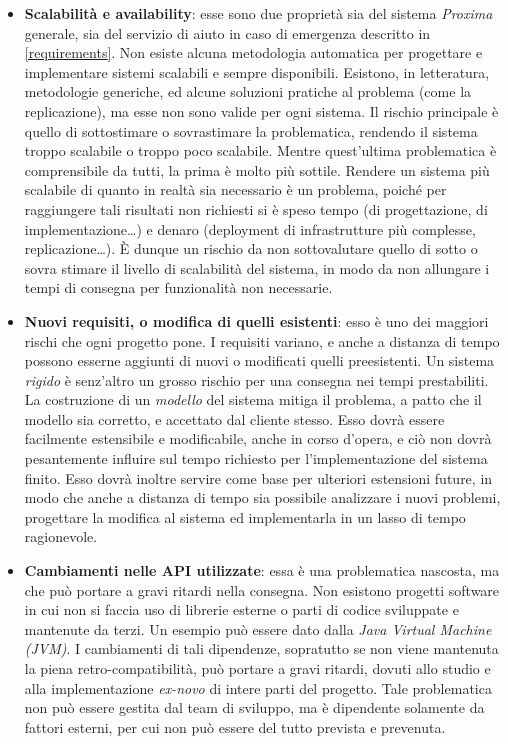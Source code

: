 \documentclass[a4paper,12pt]{report}
\begin{document}
\begin{itemize}
	\item \textbf{Scalabilità e availability}: esse sono due proprietà sia del sistema \emph{Proxima} generale, sia del servizio di aiuto in caso di emergenza descritto in \autoref{requirements}. Non esiste alcuna metodologia automatica per progettare e implementare sistemi scalabili e sempre disponibili. Esistono, in letteratura, metodologie generiche, ed alcune soluzioni pratiche al problema (come la replicazione), ma esse non sono valide per ogni sistema. Il rischio principale è quello di sottostimare o sovrastimare la problematica, rendendo il sistema troppo scalabile o troppo poco scalabile. Mentre quest'ultima problematica è comprensibile da tutti, la prima è molto più sottile. Rendere un sistema più scalabile di quanto in realtà sia necessario è un problema, poiché per raggiungere tali risultati non richiesti si è speso tempo (di progettazione, di implementazione\dots) e denaro (deployment di infrastrutture più complesse, replicazione\dots). \`{E} dunque un rischio da non sottovalutare quello di sotto o sovra stimare il livello di scalabilità del sistema, in modo da non allungare i tempi di consegna per funzionalità non necessarie. 
	\item \textbf{Nuovi requisiti, o modifica di quelli esistenti}: esso è uno dei maggiori rischi che ogni progetto pone. I requisiti variano, e anche a distanza di tempo possono esserne aggiunti di nuovi o modificati quelli preesistenti. Un sistema \emph{rigido} è senz'altro un grosso rischio per una consegna nei tempi prestabiliti. La costruzione di un \emph{modello} del sistema mitiga il problema, a patto che il modello sia corretto, e accettato dal cliente stesso. Esso dovrà essere facilmente estensibile e modificabile, anche in corso d'opera, e ciò non dovrà pesantemente influire sul tempo richiesto per l'implementazione del sistema finito. Esso dovrà inoltre servire come base per ulteriori estensioni future, in modo che anche a distanza di tempo sia possibile analizzare i nuovi problemi, progettare la modifica al sistema ed implementarla in un lasso di tempo ragionevole. 
	\item \textbf{Cambiamenti nelle API utilizzate}: essa è una problematica nascosta, ma che può portare a gravi ritardi nella consegna. Non esistono progetti software in cui non si faccia uso di librerie esterne o parti di codice sviluppate e mantenute da terzi. Un esempio può essere dato dalla \emph{Java Virtual Machine (JVM)}. I cambiamenti di tali dipendenze, sopratutto se non viene mantenuta la piena retro-compatibilità, può portare a gravi ritardi, dovuti allo studio e alla implementazione \emph{ex-novo} di intere parti del progetto. Tale problematica non può essere gestita dal team di sviluppo, ma è dipendente solamente da fattori esterni, per cui non può essere del tutto prevista e prevenuta.
\end{itemize}
\end{document}
